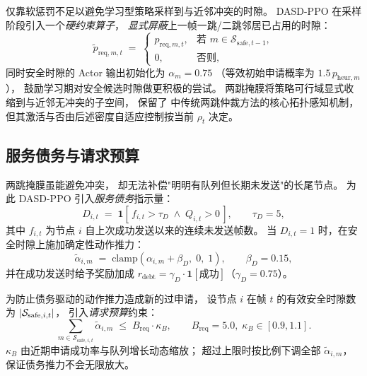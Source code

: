 仅靠软惩罚不足以避免学习型策略采样到与近邻冲突的时隙。
DASD-PPO 在采样阶段引入一个\emph{硬约束算子}，
\emph{显式屏蔽}上一帧一跳/二跳邻居已占用的时隙：
\begin{equation}
\tilde p_{\mathrm{req},m,t} \;=\;
\begin{cases}
p_{\mathrm{req},m,t}, & \text{若 } m\in\mathcal{S}_{\mathrm{safe},t-1},\\
0,                    & \text{否则},
\end{cases}
\label{eq:mask}
\end{equation}
同时安全时隙的 Actor 输出初始化为 \(\alpha_m=0.75\)
（等效初始申请概率为 \(1.5\,p_{\mathrm{heur},m}\)），
鼓励学习期对安全候选时隙做更积极的尝试。
两跳掩膜将策略可行域显式收缩到与近邻无冲突的子空间，
保留了  中传统两跳仲裁方法的核心拓扑感知机制，
但其激活与否由后述密度自适应控制按当前 \(\rho_t\) 决定。

\subsection{服务债务与请求预算}
\label{subsec:debt}

两跳掩膜虽能避免冲突，
却无法补偿"明明有队列但长期未发送"的长尾节点。
为此 DASD-PPO 引入\emph{服务债务}指示量：
\begin{equation}
D_{i,t} \;=\; \mathbf{1}\!\left[\,f_{i,t}>\tau_D\;\land\;Q_{i,t}>0\,\right],
\qquad \tau_D=5,
\label{eq:debt-indicator}
\end{equation}
其中 \(f_{i,t}\) 为节点 \(i\) 自上次成功发送以来的连续未发送帧数。
当 \(D_{i,t}=1\) 时，在安全时隙上施加确定性动作推力：
\begin{equation}
\tilde\alpha_{i,m} \;=\; \mathrm{clamp}\!\left(\alpha_{i,m}+\beta_D,\;0,\;1\right),
\qquad \beta_D=0.15,
\label{eq:debt-boost}
\end{equation}
并在成功发送时给予奖励加成 \(r_{\mathrm{debt}}=\gamma_D\cdot\mathbf{1}[\text{成功}]\)（\(\gamma_D=0.75\)）。

为防止债务驱动的动作推力造成新的过申请，
设节点 \(i\) 在帧 \(t\) 的有效安全时隙数为 \(\lvert\mathcal{S}_{\mathrm{safe},i,t}\rvert\)，
引入\emph{请求预算}约束：
\begin{equation}
\sum_{m\in\mathcal{S}_{\mathrm{safe},i,t}}\tilde\alpha_{i,m}
\;\le\; B_{\mathrm{req}}\cdot\kappa_B,
\qquad B_{\mathrm{req}}=5.0,\;\kappa_B\in[0.9,1.1].
\label{eq:budget}
\end{equation}
\(\kappa_B\) 由近期申请成功率与队列增长动态缩放；
超过上限时按比例下调全部 \(\tilde\alpha_{i,m}\)，
保证债务推力不会无限放大。

